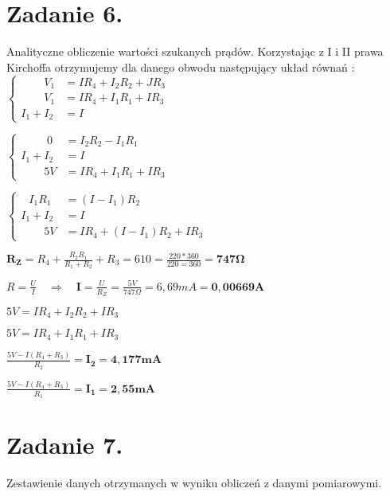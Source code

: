 \documentclass[polish,a4paper]{article}
\begin{document}
\section{Zadanie 6.}
Analityczne obliczenie wartości szukanych prądów. 
\newline
\newline
Korzystając z I i II prawa Kirchoffa otrzymujemy dla danego obwodu następujący układ równań : 
\bigbreak
\bigbreak
$ \begin{cases} 
\phantom{I_1 + }
	   V_1& = IR_4 + I_2R_2 + JR_3\\
\phantom{I_1 + }
	   V_1& = IR_4 + I_1R_1 + IR_3\\
I_1 + I_2& = I
\end{cases} $

\bigbreak
\bigbreak

$ \begin{cases}
\phantom{I_1 + .}
		0 &= I_2R_2 - I_1R_1\\
I_1 + I_2 &= I\\
\phantom{I_1 + }
	   5V &= IR_4 + I_1R_1 + IR_3
\end{cases} $

\bigbreak
\bigbreak

$ \begin{cases}
\phantom{I. }
   I_1R_1 &= (I - I_1)R_2\\
I_1 + I_2 &= I\\
\phantom{I_1 + }
	   5V &= IR_4 + (I - I_1)R_2 + IR_3
\end{cases} $

\bigbreak
\bigbreak


$\bm{R_Z} = R_4 + \frac{R_2R_1}{R_1 + R_2} + R_3 = 610 = \frac{220*360}{220 = 360} = \bm{747\Omega}$
\bigbreak

$R = \frac{U}{I}\quad\Rightarrow\quad \bm{I} = \frac{U}{R_Z} = \frac{5V}{747\Omega} = 6,69mA = \bm{0,00669A}$
\bigbreak
\bigbreak

$5V = IR_4 + I_2R_2 + IR_3$
\bigbreak

$5V = IR_4 + I_1R_1 + IR_3$
\bigbreak
\bigbreak

$\frac{5V - I(R_4 + R_3)}{R_2} = \bm{I_2 = 4,177mA}$
\bigbreak

$\frac{5V - I(R_4 + R_3)}{R_1} = \bm{I_1 = 2,55mA}$

\section{Zadanie 7.}
Zestawienie danych otrzymanych w wyniku obliczeń z danymi pomiarowymi.
\end{document}
